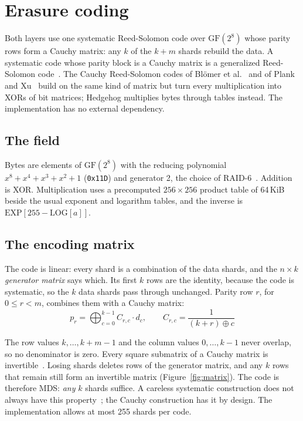 \documentclass[10pt,a4paper,final]{article}
\newcommand{\code}[1]{\texttt{#1}}
\begin{document}
\section{Erasure coding}
\label{sec:coding}

Both layers use one systematic Reed-Solomon code over $\mathrm{GF}(2^8)$ whose parity rows form a Cauchy matrix:
any $k$ of the $k + m$ shards rebuild the data. A systematic code whose parity block is a Cauchy matrix is a
generalized Reed-Solomon code~\cite{roth1985}. The Cauchy Reed-Solomon codes of Bl\"omer et
al.~\cite{blomer1995} and of Plank and Xu~\cite{plank2006} build on the same kind of matrix but turn every
multiplication into XORs of bit matrices; Hedgehog multiplies bytes through tables instead. The implementation has
no external dependency.

\subsection{The field}

Bytes are elements of $\mathrm{GF}(2^8)$ with the reducing polynomial $x^8 + x^4 + x^3 + x^2 + 1$ (\code{0x11D})
and generator 2, the choice of RAID-6~\cite{anvin2004}. Addition is XOR. Multiplication uses a precomputed
$256 \times 256$ product table of 64\,KiB beside the usual exponent and logarithm tables, and the inverse is
$\mathrm{EXP}[255 - \mathrm{LOG}[a]]$.

\subsection{The encoding matrix}

The code is linear: every shard is a combination of the data shards, and the $n \times k$ \emph{generator matrix}
says which. Its first $k$ rows are the identity, because the code is systematic, so the $k$ data shards pass through
unchanged. Parity row $r$, for $0 \le r < m$, combines them with a Cauchy matrix:
\begin{equation}
	p_r = \bigoplus_{c=0}^{k-1} C_{r,c} \cdot d_c, \qquad C_{r,c} = \frac{1}{(k + r) \oplus c}
\end{equation}

The row values $k, \dots, k+m-1$ and the column values $0, \dots, k-1$ never overlap, so no denominator is zero.
Every square submatrix of a Cauchy matrix is invertible~\cite{blomer1995,roth1989,macwilliams1977}. Losing shards
deletes rows of the generator matrix, and any $k$ rows that remain still form an invertible matrix
(Figure~\ref{fig:matrix}). The code is therefore MDS: \emph{any} $k$ shards suffice. A careless systematic
construction does not always have this property~\cite{plank2005}; the Cauchy construction has it by design. The
implementation allows at most 255 shards per code.
\end{document}
